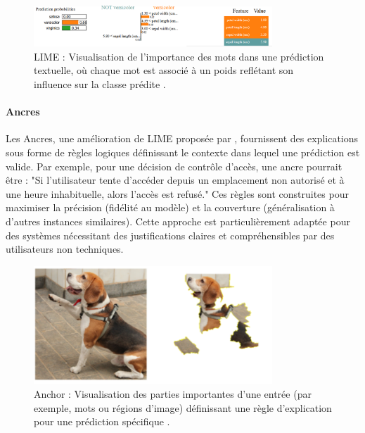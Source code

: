 \begin{figure}[h]
    \centering
    \includegraphics[width=0.8\textwidth]{My-Thesis/Chap1/images/lime_explanation.png}
    \caption{LIME : Visualisation de l’importance des mots dans une prédiction textuelle, où chaque mot est associé à un poids reflétant son influence sur la classe prédite \citep{ribeiro2016why}.}
    \label{fig:lime}
\end{figure}

\paragraph{Ancres}  
Les Ancres, une amélioration de LIME proposée par \citet{ribeiro2018anchors}, fournissent des explications sous forme de règles logiques définissant le contexte dans lequel une prédiction est valide. Par exemple, pour une décision de contrôle d'accès, une ancre pourrait être : "Si l’utilisateur tente d’accéder depuis un emplacement non autorisé et à une heure inhabituelle, alors l’accès est refusé." Ces règles sont construites pour maximiser la précision (fidélité au modèle) et la couverture (généralisation à d’autres instances similaires). Cette approche est particulièrement adaptée pour des systèmes nécessitant des justifications claires et compréhensibles par des utilisateurs non techniques.

\begin{figure}[h]
    \centering
    \includegraphics[width=0.8\textwidth]{My-Thesis/Chap1/images/anchor_explanation.png}
    \caption{Anchor : Visualisation des parties importantes d’une entrée (par exemple, mots ou régions d’image) définissant une règle d’explication pour une prédiction spécifique \citep{ribeiro2018anchors}.}
    \label{fig:anchor}
\end{figure}

